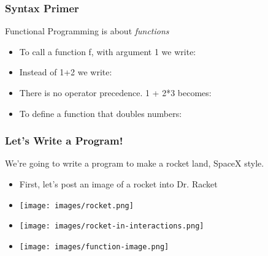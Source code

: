 \documentclass{beamer}
\begin{document}






\begin{frame}
  \frametitle{Syntax Primer}
  Functional Programming is about \emph{functions}
  \begin{itemize}
  \item<1-> To call a function f, with argument 1 we write: \syntaxOne
  \item<2-> Instead of 1+2 we write: \syntaxTwo
  \item<3-> There is no operator precedence. 1 + 2*3 becomes: \syntaxThree
  \item<4-> To define a function that doubles numbers: \syntaxFour    
  \end{itemize}
\end{frame}

\begin{frame}
  \frametitle{Let's Write a Program!}
  We're going to write a program to make a rocket land, SpaceX style.
  \begin{itemize}
  \item<1-> First, let's post an image of a rocket into Dr. Racket
  \item<2-> \texttt{[image: images/rocket.png]}
  \item<3-> \texttt{[image: images/rocket-in-interactions.png]}
  \item<4-> \texttt{[image: images/function-image.png]}
  \end{itemize}
\end{frame}
\end{document}
